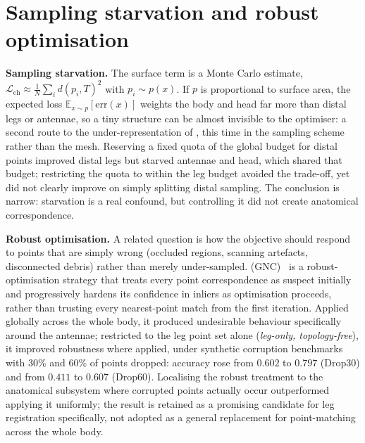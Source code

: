 \section{Sampling starvation and robust optimisation}
\label{sec:sampling}

\textbf{Sampling starvation.} The surface term is a Monte Carlo estimate,
$\mathcal{L}_{\mathrm{ch}}\approx\frac1N\sum_i d(p_i,T)^2$ with
$p_i\sim p(x)$. If $p$ is proportional to surface area, the expected loss
$\mathbb{E}_{x\sim p}[\mathrm{err}(x)]$ weights the body and head far more
than distal legs or antennae, so a tiny structure can be almost invisible to
the optimiser: a second route to the under-representation of , this
time in the sampling scheme rather than the mesh. Reserving a fixed quota of
the global budget for distal points improved distal legs but starved
antennae and head, which shared that budget; restricting the quota to within
the leg budget avoided the trade-off, yet did not clearly improve on simply
splitting distal sampling. The conclusion is narrow: starvation is a real
confound, but controlling it did not create anatomical correspondence.

\textbf{Robust optimisation.} A related question is how the objective
should respond to points that are simply wrong (occluded regions,
scanning artefacts, disconnected debris) rather than merely
under-sampled.  (GNC)~\cite{gnc} is a robust-optimisation
strategy that treats every point correspondence as suspect initially and
progressively hardens its confidence in inliers as optimisation proceeds,
rather than trusting every nearest-point match from the first iteration.
Applied globally across the whole body, it produced undesirable behaviour
specifically around the antennae; restricted to the leg point set alone
(\emph{leg-only, topology-free}), it improved robustness where applied,
under synthetic corruption benchmarks with 30\% and 60\% of points dropped:
accuracy rose from $0.602$ to $0.797$ (Drop30) and from $0.411$ to $0.607$
(Drop60). Localising the robust treatment to the anatomical subsystem where
corrupted points actually occur outperformed applying it uniformly; the
result is retained as a promising candidate for leg registration
specifically, not adopted as a general replacement for point-matching across
the whole body.
